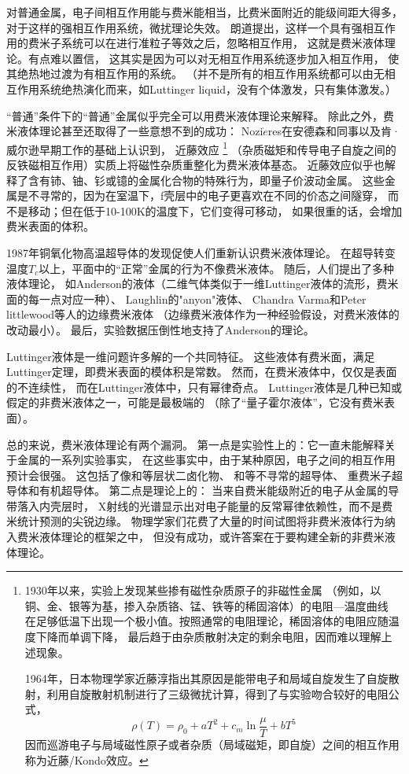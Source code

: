 \documentclass{article}
\begin{document}
对普通金属，电子间相互作用能与费米能相当，比费米面附近的能级间距大得多，
对于这样的强相互作用系统，微扰理论失效。
朗道提出，这样一个具有强相互作用的费米子系统可以在进行准粒子等效之后，忽略相互作用，
这就是费米液体理论。有点难以置信，
这其实是因为可以对无相互作用系统逐步加入相互作用，
使其绝热地过渡为有相互作用的系统。
（并不是所有的相互作用系统都可以由无相互作用系统绝热演化而来，如Luttinger liquid，没有个体激发，只有集体激发。）

“普通”条件下的“普通”金属似乎完全可以用费米液体理论来解释。
除此之外，费米液体理论甚至还取得了一些意想不到的成功：
Nozi$\grave{e}$res在安德森和同事以及肯·威尔逊早期工作的基础上认识到，
近藤效应
\footnote{
1930年以来，实验上发现某些掺有磁性杂质原子的非磁性金属
（例如，以铜、金、银等为基，掺入杂质铬、锰、铁等的稀固溶体）的电阻---温度曲线
在足够低温下出现一个极小值。按照通常的电阻理论，稀固溶体的电阻应随温度下降而单调下降，
最后趋于由杂质散射决定的剩余电阻，因而难以理解上述现象。

1964年，日本物理学家近藤淳指出其原因是能带电子和局域自旋发生了自旋散射，利用自旋散射机制进行了三级微扰计算，得到了与实验吻合较好的电阻公式，
$$
        \rho(T)=\rho_{0}+a T^{2}+c_{m}\ln\frac{\mu}{T}+b T^{5}
$$
因而巡游电子与局域磁性原子或者杂质（局域磁矩，即自旋）之间的相互作用称为近藤/Kondo效应。
}
（杂质磁矩和传导电子自旋之间的反铁磁相互作用）实质上将磁性杂质重整化为费米液体基态。
近藤效应似乎也解释了含有铈、铀、钐或镱的金属化合物的特殊行为，即量子价波动金属。
这些金属是不寻常的，因为在室温下，f壳层中的电子更喜欢在不同的价态之间隧穿，
而不是移动；但在低于10-100K的温度下，它们变得可移动，
如果很重的话，会增加费米表面的体积。


1987年铜氧化物高温超导体的发现促使人们重新认识费米液体理论。
在超导转变温度$T_c$以上，平面中的“正常”金属的行为不像费米液体。
随后，人们提出了多种液体理论，
如Anderson的液体（二维气体类似于一维Luttinger液体的流形，费米面的每一点对应一种）、
Laughlin的"anyon"液体、
Chandra Varma和Peter littlewood等人的边缘费米液体
（边缘费米液体作为一种经验假设，对费米液体的改动最小）。
最后，实验数据压倒性地支持了Anderson的理论。

Luttinger液体是一维问题许多解的一个共同特征。
这些液体有费米面，满足Luttinger定理，即费米表面的模体积是常数。
然而，在费米液体中，仅仅是表面的不连续性，
而在Luttinger液体中，只有幂律奇点。
Luttinger液体是几种已知或假定的非费米液体之一，可能是最极端的
（除了“量子霍尔液体”，它没有费米表面）。

总的来说，费米液体理论有两个漏洞。
第一点是实验性上的：它一直未能解释关于金属的一系列实验事实，
在这些事实中，由于某种原因，电子之间的相互作用预计会很强。
这包括了像和等层状二卤化物、
和等不寻常的超导体、
重费米子超导体和有机超导体。
第二点是理论上的：
当来自费米能级附近的电子从金属的导带落入内壳层时，
X射线的光谱显示出对电子能量的反常幂律依赖性，而不是费米统计预测的尖锐边缘。 
物理学家们花费了大量的时间试图将非费米液体行为纳入费米液体理论的框架之中，
但没有成功，或许答案在于要构建全新的非费米液体理论。
\end{document}
